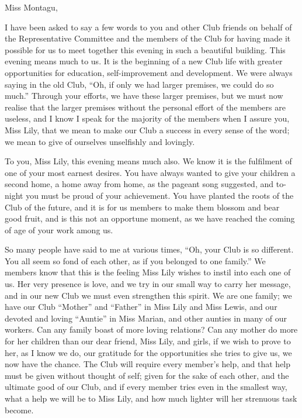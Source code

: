 \renewcommand*{\precisfont}{\normalfont\center}
\renewcommand*{\postchapterprecis}{\end{quote}\vspace*{\baselineskip}}

\noindent Miss Montagu,

I have been asked to say a few words to you and other
Club friends on behalf of the Representative Committee
and the members of the Club for having made it possible
for us to meet together this evening in such a beautiful
building. This evening means much to us. It is the beginning
of a new Club life with greater opportunities for
education, self-improvement and development. We were
always saying in the old Club, “Oh, if only we had larger
premises, we could do so much.” Through your efforts,
we have these larger premises, but we must now realise
that the larger premises without the personal effort of the
members are useless, and I know I speak for the majority
of the members when I assure you, Miss Lily, that we
mean to make our Club a success in every sense of the
word; we mean to give of ourselves unselfishly and
lovingly.

To you, Miss Lily, this evening means much also. We
know it is the fulfilment of one of your most earnest
desires. You have always wanted to give your children a
second home, a home away from home, as the pageant
song suggested, and to-night you must be proud of your
achievement. You have planted the roots of the Club of
the future, and it is for us members to make them
blossom and bear good fruit, and is this not an opportune
moment, as we have reached the coming of age of your
work among us.

So many people have said to me at various times, “Oh,
your Club is so different. You all seem so fond of each
other, as if you belonged to one family.” We members
know that this is the feeling Miss Lily wishes to instil into
each one of us. Her very presence is love, and we try
in our small way to carry her message, and in our new
Club we must even strengthen this spirit. We are one
family; we have our Club “Mother” and “Father” in
Miss Lily and Miss Lewis, and our devoted and loving
“Auntie” in Miss Marian, and other aunties in many of
our workers. Can any family boast of more loving relations?
Can any mother do more for her children than
our dear friend, Miss Lily, and girls, if we wish to prove
to her, as I know we do, our gratitude for the opportunities
she tries to give us, we now have the chance. The
Club will require every member’s help, and that help
must be given without thought of self; given for the sake
of each other, and the ultimate good of our Club, and if
every member tries even in the smallest way, what a
help we will be to Miss Lily, and how much lighter will
her strenuous task become.

